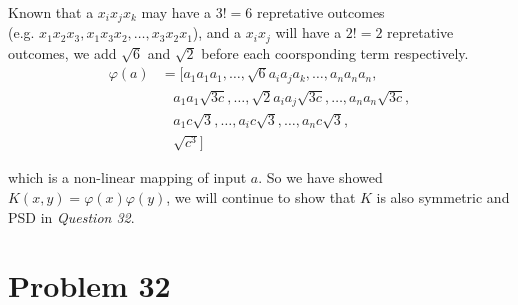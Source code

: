 \documentclass[12pt]{article}
\newcommand{\vphi}{\varphi}
\begin{document}
Known that a $x_i x_j x_k$  may have a $3! = 6$ repretative outcomes\\ (e.g. $x_1 x_2 x_3, x_1 x_3 x_2, \dots, x_3 x_2 x_1$), and a $x_i x_j$  will have a $2! = 2$ repretative outcomes, we add $\sqrt{6}$ and $\sqrt{2}$ before each coorsponding term respectively. 
\begin{align*}
    \vphi(a) &= [a_1 a_1 a_1, \dots, \sqrt{6}a_i a_j a_k, \dots, a_n a_n a_n, \\
    &\ \ \ \  a_1 a_1 \sqrt{3c}, \dots,\sqrt{2}  a_i a_j \sqrt{3c}, \dots, a_n a_n \sqrt{3c},\\
    &\ \ \ \  a_1 c\sqrt{3}, \dots,  a_i c\sqrt{3}, \dots, a_n c\sqrt{3}, \\
    &\ \ \ \  \sqrt{c^3} ]
\end{align*}

which is a non-linear mapping of input $a$. So we have showed $K(x, y) = \vphi(x)\vphi(y)$, we will continue to show that $K$ is also symmetric and PSD in \textit{Question 32}.

\section{Problem 32}
\end{document}
